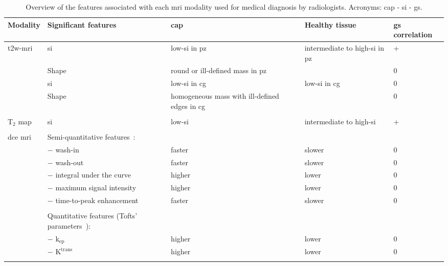 \begin{landscape}
\begin{table}
  \scriptsize
    \caption{Overview of the features associated with each \acs*{mri} modality used for medical diagnosis by radiologists. Acronyms: \acf{cap} - \acf{si} - \acf{gs}.}\label{tab:modmri}
    \begin{threeparttable}
      \centering
      \noindent
      \begin{tabularx}{\linewidth}{@{} l X X X l @{}}
        \toprule
        \textbf{Modality} & \textbf{Significant features} & \textbf{\acs*{cap}} & \textbf{Healthy tissue} & \textbf{\acs*{gs} correlation} \\
        \midrule
        \acs*{t2w}-\acs*{mri} & \acs*{si} & low-\acs*{si} in \acs*{pz}~\cite{Hricak1987} & intermediate to high-\acs*{si} in \acs*{pz}~\cite{Hricak1987} & +~\cite{Wang2008} \\ 
        & Shape & round or ill-defined mass in \acs*{pz}~\cite{Hricak1983} &  & 0 \\
        & \acs*{si} & low-\acs*{si} in \acs*{cg}~\cite{Akin2006,Barentsz2012} & low-\acs*{si} in \acs*{cg}~\cite{Akin2006,Barentsz2012} & 0 \\
        & Shape & homogeneous mass with ill-defined edges in \acs*{cg}~\cite{Akin2006, Barentsz2012} &  & 0 \\ \\
        T$_2$ map & \acs*{si} & low-\acs*{si}~\cite{Liney1996,Gibbs2001} & intermediate to high-\acs*{si}~\cite{Liney1996,Gibbs2001} & +~\cite{Liu2011,Liney1996,Liney1997}  \\ \\
        \acs*{dce} \acs*{mri} & Semi-quantitative features~\cite{Verma2012}: & & & \\
        & $-$ wash-in & faster & slower & 0 \\
        & $-$ wash-out & faster & slower & 0 \\
        & $-$ integral under the curve & higher & lower & 0 \\
        & $-$ maximum signal intensity & higher & lower & 0 \\
        & $-$ time-to-peak enhancement & faster & slower & 0 \\ \\
        & Quantitative features (Tofts' parameters~\cite{Tofts2010}): & & & \\
        & $-$ $\text{k}_{\text{ep}}$ & higher & lower & 0 \\
        & $-$ $\text{K}^{\text{trans}}$ & higher & lower & 0 \\ \\

\end{tabularx}
\end{threeparttable}
\end{table}
\end{landscape}
